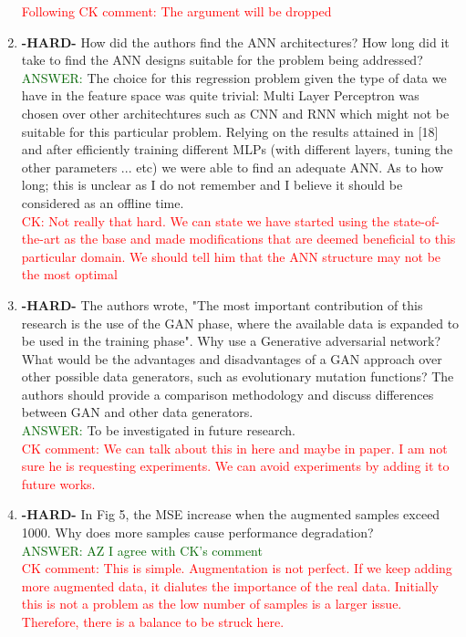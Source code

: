 \documentclass{article}
\begin{document}
\begin{enumerate}
\textcolor{red}{Following CK comment: The argument will be dropped}

\item \textbf{-HARD-} How did the authors find the ANN architectures? How long did it take to find the ANN designs suitable for the problem being addressed? \\
\textcolor{darkgreen}{ANSWER: } The choice for this regression problem given the type of data we have in the feature space was quite trivial: Multi Layer Perceptron was chosen over other architechtures such as CNN and RNN which might not be suitable for this particular problem. Relying on the results attained in [18] and after efficiently training different MLPs (with different layers, tuning the other parameters ... etc) we were able to find an adequate ANN. As to how long; this is unclear as I do not remember and I believe it should be considered as an offline time.\\   

\textcolor{red}{CK: Not really that hard. We can state we have started using the state-of-the-art as the base and made modifications that are deemed beneficial to this particular domain. We should tell him that the ANN structure may not be the most optimal}

\item \textbf{-HARD-} The authors wrote, "The most important contribution of this research is the use of
the GAN phase, where the available data is expanded to be
used in the training phase". Why use a Generative adversarial network? What would be the advantages and disadvantages of a GAN approach over other possible data generators, such as evolutionary mutation functions? The authors should provide a comparison methodology and discuss differences between GAN and other data generators. \\
\textcolor{darkgreen}{ANSWER: } To be investigated in future research.\\ \textcolor{red}{CK comment: We can talk about this in here and maybe in paper. I am not sure he is requesting experiments. We can avoid experiments by adding it to future works.}


\item \textbf{-HARD-} In Fig 5, the MSE increase when the augmented samples exceed 1000. Why does more samples cause performance degradation? \\ 
\textcolor{darkgreen}{ANSWER: AZ I agree with CK's comment}\\ \textcolor{red}{CK comment: This is simple. Augmentation is not perfect. If we keep adding more augmented data, it dialutes the importance of the real data. Initially this is not a problem as the low number of samples is a larger issue. Therefore, there is a balance to be struck here.} 



\end{enumerate}
\end{document}
